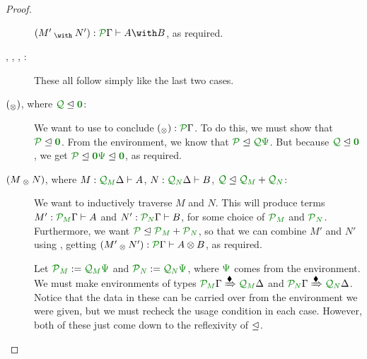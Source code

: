 \documentclass[submission,copyright,creativecommons]{eptcs}
\begin{document}
\begin{proof}
\begin{description}
      $\wth{M'}{N'} : \ctx{\Gamma}{P} \vdash \withT{A}{B}$, as required.
    \item[\TirName{$\withT{}{}$-El}, \TirName{$\withT{}{}$-Er},
      \TirName{$\sumT{}{}$-Il}, \TirName{$\sumT{}{}$-Ir}:]
      These all follow simply like the last two cases.
    \item[\TirName{$\tensorOne$-I} $(\mathbin{_\otimes})$, where
      $\resctx Q \subres \rescomment{\vct 0}$:]
      We want to use  to conclude
      $\unit : \ctx{\Gamma}{P}$.
      To do this, we must show that $\resctx P \subres \rescomment{\vct 0}$.
      From the environment, we know that
      $\resctx P \subres \resctx Q\rescomment\Psi$.
      But because $\resctx Q \subres \rescomment{\vct 0}$, we get
      $\resctx P \subres \rescomment{\vct 0}\rescomment\Psi
      \subres \rescomment{\vct 0}$, as required.
    \item[\TirName{$\tensor{}{}$-I} $(M \mathbin{_{\otimes}} N)$, where
      $M : \ctx{\Delta}{Q_{\mathnormal M}} \vdash A$,
      $N : \ctx{\Delta}{Q_{\mathnormal N}} \vdash B$,
      $\resctx Q \subres \resctx Q_{\rescomment M} + \resctx Q_{\rescomment N}$:]
      We want to inductively traverse $M$ and $N$.
      This will produce terms
      $M' : \ctx{\Gamma}{P_{\mathnormal M}} \vdash A$ and
      $N' : \ctx{\Gamma}{P_{\mathnormal N}} \vdash B$, for some choice of
      $\resctx P_{\rescomment M}$ and $\resctx P_{\rescomment N}$.
      Furthermore, we want
      $\resctx P \subres \resctx P_{\rescomment M} + \resctx P_{\rescomment N}$,
      so that we can combine $M'$ and $N'$ using ,
      getting $\ten{M'}{N'} : \ctx{\Gamma}{P} \vdash \tensor{A}{B}$, as
      required.

      Let
      $\resctx P_{\rescomment M} := \resctx Q_{\rescomment M}\rescomment\Psi$
      and
      $\resctx P_{\rescomment N} := \resctx Q_{\rescomment N}\rescomment\Psi$,
      where $\rescomment\Psi$ comes from the environment.
      We must make environments of types
      $\ctx{\Gamma}{P_{\mathnormal M}}
      \subst{\kitrel} \ctx{\Delta}{Q_{\mathnormal M}}$
      and
      $\ctx{\Gamma}{P_{\mathnormal N}}
      \subst{\kitrel} \ctx{\Delta}{Q_{\mathnormal N}}$.
      Notice that the data in these can be carried over from the environment we
      were given, but we must recheck the usage condition in each case.
      However, both of these just come down to the reflexivity of $\trianglelefteq$.


\end{description}
\end{proof}
\end{document}
